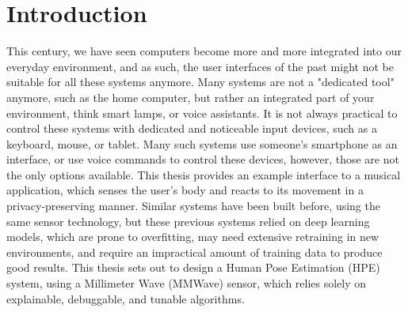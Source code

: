 \chapter{Introduction}
\label{chapter: introduction}


This century, we have seen computers become more and more integrated into our everyday environment, and as such, the user interfaces of the past might not be suitable for all these systems anymore.
Many systems are not a "dedicated tool" anymore, such as the home computer, but rather an integrated part of your environment, think smart lamps, or voice assistants.
It is not always practical to control these systems with dedicated and noticeable input devices, such as a keyboard, mouse, or tablet.
Many such systems use someone's smartphone as an interface, or use voice commands to control these devices, however, those are not the only options available.
This thesis provides an example interface to a musical application, which senses the user's body and reacts to its movement in a privacy-preserving manner.
Similar systems have been built before, using the same sensor technology, but these previous systems relied on deep learning models, which are prone to overfitting, may need extensive retraining in new environments, and require an impractical amount of training data to produce good results.
This thesis sets out to design a Human Pose Estimation (HPE) system, using a Millimeter Wave (MMWave) sensor, which relies solely on explainable, debuggable, and tunable algorithms.






% 

% 

% 

% 

% 
